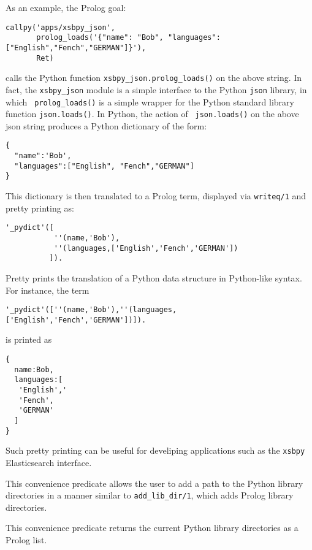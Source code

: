 \begin{description}
 As an example, the Prolog goal:

 \begin{verbatim}
callpy('apps/xsbpy_json',
       prolog_loads('{"name": "Bob", "languages": ["English","Fench","GERMAN"]}'),
       Ret)
\end{verbatim}
 
\noindent 
calls the Python function {\tt xsbpy\_json.prolog\_loads()} on the
above string.  In fact, the {\tt xsbpy\_json} module is a simple
interface to the Python {\tt json} library, in which {\tt
  prolog\_loads()} is a simple wrapper for the Python standard library
function {\tt json.loads()}.  In Python, the action of {\tt
  json.loads()} on the above json string produces a Python dictionary
of the form:
\begin{verbatim}
{
  "name":'Bob',
  "languages":["English", "Fench","GERMAN"]
}
\end{verbatim}
This dictionary is then translated to a Prolog term, displayed via
{\tt writeq/1} and pretty printing as:
\begin{verbatim}
'_pydict'([
           ''(name,'Bob'),
           ''(languages,['English','Fench','GERMAN'])
          ]).
\end{verbatim}


Pretty prints the translation of a Python data structure in
Python-like syntax.  For instance, the term

\begin{verbatim}
'_pydict'([''(name,'Bob'),''(languages,['English','Fench','GERMAN'])]).
\end{verbatim}

\noindent
is printed as 
\begin{verbatim}
{
  name:Bob,
  languages:[
   'English','
   'Fench',
   'GERMAN'
  ]
}
\end{verbatim}

Such pretty printing can be useful for develiping applications such as
the {\tt xsbpy} Elasticsearch interface.

%
This convenience predicate allows the user to add a path to the Python
library directories in a manner similar to {\tt add\_lib\_dir/1},
which adds Prolog library directories.  

%
This convenience predicate returns the current Python library
directories as a Prolog list.

\end{description}


